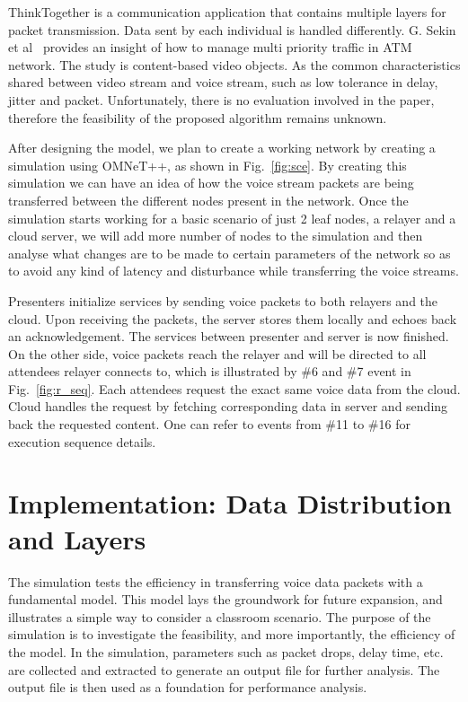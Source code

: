 
ThinkTogether is a communication application that contains multiple layers for
packet transmission. Data sent by each individual is handled differently. G.
Sekin et al~\cite{GF_COM00} provides an insight of how to manage multi
priority traffic in ATM network. The study is content-based video
objects. As the common characteristics shared between video stream and voice
stream, such as low tolerance in delay, jitter and packet. Unfortunately, there
is no evaluation involved in the paper, therefore the feasibility of the proposed
algorithm remains unknown.

After designing the model, we plan to create a working
network by creating a simulation using OMNeT++, as shown in Fig.~\ref{fig:sce}.
By creating this simulation we can have an idea of how the voice stream packets
are being transferred between the different nodes present in the network. Once
the simulation starts working for a basic scenario of just 2 leaf nodes, a
relayer and a cloud server, we will add more number of nodes to the simulation
and then analyse what changes are to be made to certain parameters of the
network so as to avoid any kind of latency and disturbance while transferring
the voice streams.

Presenters initialize services by sending voice packets to both relayers and
the cloud. Upon receiving the packets, the server stores them
locally and echoes back an acknowledgement. The services between presenter and
server is now finished. On the other side,
voice packets reach the relayer and will be directed to all attendees relayer
connects to, which is illustrated by \#6 and \#7 event in Fig.~\ref{fig:r_seq}.
Each attendees request the exact same voice data from the cloud.
Cloud handles the request by fetching corresponding data in server and sending
back the requested content. One can refer to events from \#11 to \#16 for
execution sequence details.



\section{Implementation: Data Distribution and Layers}

The simulation tests the efficiency in transferring voice data packets
with a fundamental model. This model lays the groundwork for future expansion,
and illustrates a simple way to consider a classroom scenario. The purpose of
the simulation is to investigate the feasibility, and more importantly, the efficiency of the
model. In the simulation, parameters such as packet drops, delay time, etc. are
collected and extracted to generate an output file for further analysis. The
output file is then used as
a foundation for performance analysis.


